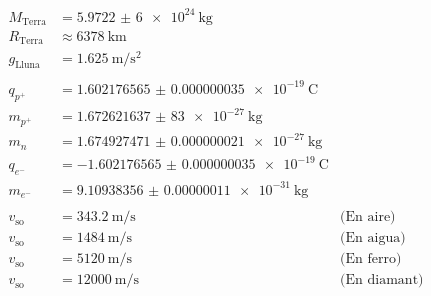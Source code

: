 \begin{align*}
    \\
    M_\text{Terra} &= \SI{5,9722(6)e24}{\kilo\gram}\\
    R_\text{Terra} &\approx \SI{6378}{\kilo\metre}\\
    g_\text{Lluna} &= \SI{1,625}{\metre\per\second\squared}\\
    \\
    q_{p^+} &= \SI{1.602176565(35)e-19}{\coulomb}\\
    m_{p^+} &= \SI{1,672621637(83)e-27}{\kilo\gram}\\
    m_{n} &= \SI{1.674927471(21)e-27}{\kilo\gram}\\
    q_{e^-} &= \SI{-1.602176565(35)e-19}{\coulomb}\\
    m_{e^-} &= \SI{9.10938356(11)e-31}{\kilo\gram}\\
    \\
    v_\text{so} &= \SI{343.2}{\metre\per\second} & \text{(En aire)}\\
    v_\text{so} &= \SI{1484}{\metre\per\second} & \text{(En aigua)}\\
    v_\text{so} &= \SI{5120}{\metre\per\second} & \text{(En ferro)}\\
    v_\text{so} &= \SI{12000}{\metre\per\second} & \text{(En diamant)}\\
\end{align*}



